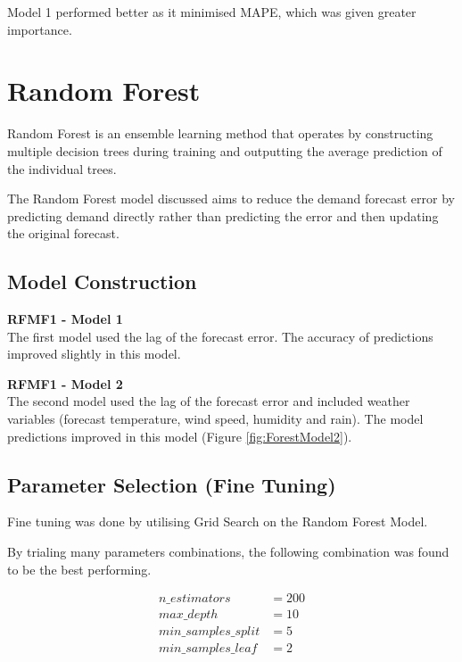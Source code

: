 \documentclass[mstat,12pt]{unswthesis}
\begin{document}
Model 1 performed better as it minimised MAPE, which was given greater importance.

\section{Random Forest}\label{random-forest}

Random Forest is an ensemble learning method that operates by constructing multiple decision trees during training and outputting the average prediction of the individual trees.

The Random Forest model discussed aims to reduce the demand forecast error by predicting demand directly rather than predicting the error and then updating the original forecast.

\subsection{Model Construction}\label{model-construction-2}

\textbf{RFMF1 - Model 1}\\
The first model used the lag of the forecast error. The accuracy of predictions improved slightly in this model.
\bigskip

\noindent\textbf{RFMF1 - Model 2}\\
The second model used the lag of the forecast error and included weather variables (forecast temperature, wind speed, humidity and rain). The model predictions improved in this model (Figure \ref{fig:ForestModel2}).

\subsection{Parameter Selection (Fine Tuning)}\label{parameter-selection-fine-tuning}

Fine tuning was done by utilising Grid Search on the Random Forest Model.

\bigskip

By trialing many parameters combinations, the following combination was found to be the best performing.

\begin{align*}
n\_estimators&=200\\ 
max\_depth&=10\\ 
min\_samples\_split&=5\\ 
min\_samples\_leaf&=2\\
\end{align*}
\end{document}
